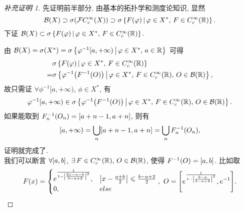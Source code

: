 \begin{proof}[补充证明 1]
先证明前半部分, 由基本的拓扑学和测度论知识, 显然
\[\BB\xk{X}\supset\sigma\xk{\FF C_c^\infty\xk{X}}\supset\sigma\jh{F\xk{\phi}}{\phi\in X^*,\,F\in C_c^\infty\xk{\rr}}.\]
下证 $\BB\xk{X}\subset\sigma\jh{F\xk{\phi}}{\phi\in X^*,\,F\in C_c^\infty\xk{\rr}}.$\par
由 $\BB\xk{X}=\sigma\xk{X^*}=\sigma\jh{\phi^{-1}[a,+\infty)}{\phi\in X^*,\,a\in\rr}$ 可得
\begin{align*}
&\sigma\jh{F\xk{\phi}}{\phi\in X^*,\,F\in\cci\xk{\rr}}\\
=&\sigma\jh{\phi^{-1}\xk{F^{-1}\xk{O}}}{\phi\in X^*,\,F\in\cci\xk{\rr},\,O\in\BB\xk{\rr}},
\end{align*}
故只需证 $\forall\phi^{-1}[a,+\infty)$, $\phi\in X^*$, 有
\[\phi^{-1}[a,+\infty)\in\sigma\jh{\phi^{-1}\xk{F^{-1}\xk{O}}}{\phi\in X^*,\,F\in\cci\xk{\rr},\,O\in\BB\xk{\rr}}.\]
如果能取到 $F_n^{-1}\xk{O_n}=[a+n-1,a+n]$, 则有
\[[a,+\infty)=\bigcup_{n}[a+n-1,a+n]=\bigcup_{n}F_n^{-1}\xk{O_n},\]
证明就完成了.\\
我们可以断言 $\forall\zk{a,b}$, $\exists F\in\cci\xk{\rr},\,O\in\BB\xk{\rr}$, 使得 $F^{-1}\xk{O}=\zk{a,b}$. 比如取
\begin{equation*}
F\xk{x}=
\begin{cases}
e^{\frac{1}{1-\jd{\frac{2x-a-b}{b-a+2}}^2}}, & \jd{x-\frac{a+b}{2}}\leq\frac{b-a+2}{2}\\
0, & else
\end{cases}
,\ O=\zk{e^{\frac{1}{1-\jd{\frac{b-a}{b-a+2}}^2}},e^{-1}}.\qedhere
\end{equation*}
\end{proof}
